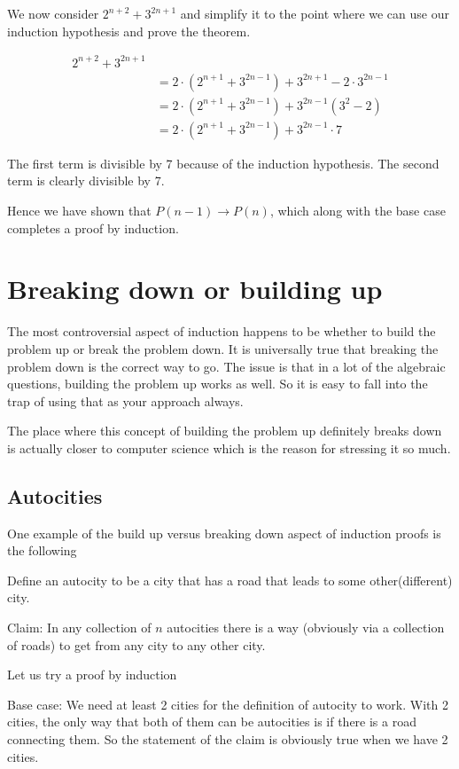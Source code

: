 \documentclass[12pt]{article}
\begin{document}
We now consider $2^{n+2} +3^{2n+1}$ and simplify it to the point where we can use our induction hypothesis and prove the theorem.

\begin{align*}
2^{n+2} + 3^{2n+1} \\
&= 2\cdot(2^{n+1} + 3^{2n-1}) + 3^{2n+1} - 2\cdot 3^{2n-1} \\
&= 2\cdot(2^{n+1} + 3^{2n-1}) + 3^{2n-1}(3^2 - 2) \\
&= 2\cdot(2^{n+1} + 3^{2n-1}) + 3^{2n-1}\cdot 7 
\end{align*}

The first term is divisible by 7 because of the induction hypothesis. The second term is clearly divisible by 7.

Hence we have shown that $P(n-1) \rightarrow P(n)$, which along with the base case completes a proof by induction.

\section*{Breaking down or building up}

The most controversial aspect of induction happens to be whether to build the problem up or break the problem down. It is universally true that breaking the problem down is the correct way to go. The issue is that in a lot of the algebraic questions, building the problem up works as well. So it is easy to fall into the trap of using that as your approach always. 

The place where this concept of building the problem up definitely breaks down is actually closer to computer science which is the reason for stressing it so much.

\subsection*{Autocities}

One example of the build up versus breaking down aspect of induction proofs is the following

Define an autocity to be a city that has a road that leads to some other(different) city. 

Claim: In any collection of $n$ autocities there is a way (obviously via a collection of roads) to get from any city to any other city.

Let us try a proof by induction

Base case: We need at least 2 cities for the definition of autocity to work. With 2 cities, the only way that both of them can be autocities is if there is a road connecting them. So the statement of the claim is obviously true when we have 2 cities.
\end{document}
